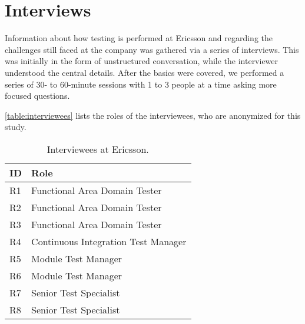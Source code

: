 \section{Interviews}
\label{sec:ind_interviews}


Information about how testing is performed at Ericsson and regarding the challenges still faced at the company was gathered via a series of interviews.
This was initially in the form of unstructured conversation, while the interviewer understood the central details.
After the basics were covered, we performed a series of 30- to 60-minute sessions with 1 to 3 people at a time asking more focused questions.

\autoref{table:interviewees} lists the roles of the interviewees, who are anonymized for this study.

\begin{table}[]
\centering
{}
\begin{tabular}{ll}
\toprule
\textbf{ID} & \textbf{Role} \\
\midrule
R1 & Functional Area Domain Tester \\
R2 & Functional Area Domain Tester \\
R3 & Functional Area Domain Tester \\
R4 & Continuous Integration Test Manager \\
R5 & Module Test Manager \\
R6 & Module Test Manager \\
R7 & Senior Test Specialist \\
R8 & Senior Test Specialist \\
\bottomrule
\end{tabular}\\
\caption{Interviewees at Ericsson.}
\label{table:interviewees}
\end{table}

%

